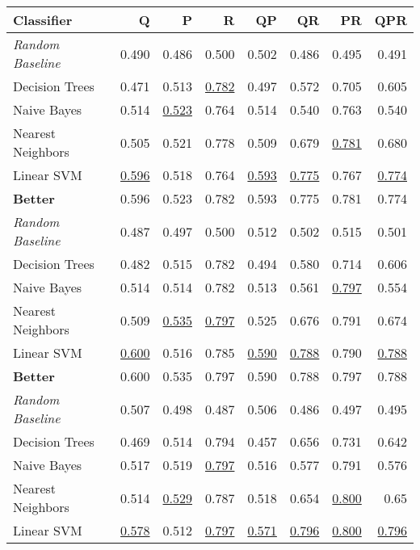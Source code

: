 \documentclass[runningheads]{llncs}
\begin{document}
\begin{table*}[t]
	\begin{tabular}{lrrrrrrr}    \toprule
		\textbf{Classifier}        & \textsc{Q}         & \textsc{P}         & \textsc{R}         & \textsc{QP}        & \textsc{QR}        & \textsc{PR}        & \textsc{QPR}       \\    \midrule
		\textit{Random Baseline}   & 0.490  & 0.486 & 0.500   & 0.502 & 0.486 & 0.495 & 0.491 \\
		Decision Trees    & 0.471 & 0.513 & \underline{0.782} & 0.497 & 0.572 & 0.705 & 0.605 \\
		Naive Bayes       & 0.514 & \underline{0.523} & 0.764 & 0.514 & 0.540 & 0.763 & 0.540  \\
		Nearest Neighbors & 0.505 & 0.521 & 0.778 & 0.509 & 0.679 & \underline{0.781} & 0.680  \\
		Linear SVM        & \underline{0.596} & 0.518 & 0.764 & \underline{0.593} & \underline{0.775} & 0.767 & \underline{0.774} \\    \midrule
		\textbf{Better}   & 0.596 & 0.523 & 0.782 & 0.593 & 0.775 & 0.781 & 0.774 \\    \bottomrule
		\textit{Random Baseline}   & 0.487 & 0.497 & 0.500 & 0.512 & 0.502 & 0.515 & 0.501 \\
		Decision Trees    & 0.482 & 0.515 & 0.782 & 0.494 & 0.580  & 0.714 & 0.606 \\
		Naive Bayes       & 0.514 & 0.514 & 0.782 & 0.513 & 0.561 & \underline{0.797} & 0.554 \\
		Nearest Neighbors & 0.509 & \underline{0.535} & \underline{0.797} & 0.525 & 0.676 & 0.791 & 0.674 \\
		Linear SVM        & \underline{0.600} & 0.516 & 0.785 & \underline{0.590} & \underline{0.788} & 0.790  & \underline{0.788} \\    \midrule
		\textbf{Better}   & 0.600 & 0.535 & 0.797 & 0.590 & 0.788 & 0.797 & 0.788 \\    \bottomrule
		\textit{Random Baseline}   & 0.507 & 0.498 & 0.487 & 0.506 & 0.486 & 0.497 & 0.495 \\
		Decision Trees    & 0.469 & 0.514 & 0.794 & 0.457 & 0.656 & 0.731 & 0.642 \\
		Naive Bayes       & 0.517 & 0.519 & \underline{0.797} & 0.516 & 0.577 & 0.791 & 0.576 \\
		Nearest Neighbors & 0.514 & \underline{0.529} & 0.787 & 0.518 & 0.654 & \underline{0.800} & 0.65  \\
		Linear SVM        & \underline{0.578} & 0.512 & \underline{0.797} & \underline{0.571} & \underline{0.796} & \underline{0.800} & \underline{0.796} \\    \midrule

\end{tabular}
\end{table*}
\end{document}
